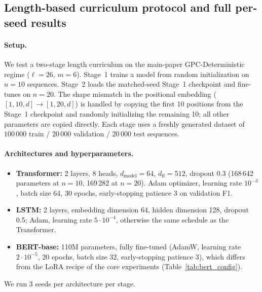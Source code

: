 \documentclass{article} %
\theoremstyle{plain}
\theoremstyle{definition}
\theoremstyle{remark}
\begin{document}
\subsection{Length-based curriculum protocol and full per-seed results}
\label{app:parity_curriculum}

\paragraph{Setup.} We test a two-stage length curriculum on the main-paper GPC-Deterministic regime ($\ell=26$, $m=6$). Stage~1 trains a model from random initialization on $n=10$ sequences. Stage~2 loads the matched-seed Stage~1 checkpoint and fine-tunes on $n=20$. The shape mismatch in the positional embedding ($[1, 10, d] \to [1, 20, d]$) is handled by copying the first 10 positions from the Stage~1 checkpoint and randomly initializing the remaining 10; all other parameters are copied directly. Each stage uses a freshly generated dataset of $100\,000$ train / $20\,000$ validation / $20\,000$ test sequences.

\paragraph{Architectures and hyperparameters.}
\begin{itemize}
\item \textbf{Transformer:} 2 layers, 8 heads, $d_{\text{model}}=64$, $d_{\text{ff}}=512$, dropout 0.3 (168\,642 parameters at $n=10$, 169\,282 at $n=20$). Adam optimizer, learning rate $10^{-3}$, batch size 64, 30 epochs, early-stopping patience 3 on validation F1.
\item \textbf{LSTM:} 2 layers, embedding dimension 64, hidden dimension 128, dropout 0.5; Adam, learning rate $5\cdot10^{-4}$, otherwise the same schedule as the Transformer.
\item \textbf{BERT-base:} 110M parameters, fully fine-tuned (AdamW, learning rate $2\cdot10^{-5}$, 20 epochs, batch size 32, early-stopping patience 3), which differs from the LoRA recipe of the core experiments (Table~\ref{tab:bert_config}).
\end{itemize}

We run 3 seeds per architecture per stage.
\end{document}
